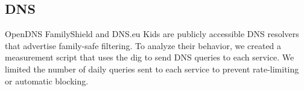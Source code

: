 
 
\subsection{DNS}
OpenDNS FamilyShield and DNS.eu Kids are publicly accessible DNS resolvers that advertise family-safe filtering.
To analyze their behavior, we created a measurement script that uses the dig to send DNS queries to each service.
We limited the number of daily queries sent to each service to prevent rate-limiting or automatic blocking.


